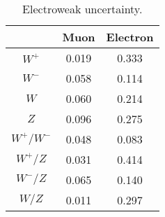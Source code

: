 \begin{table}%
\begin{center}
\end{center}


\caption{Uncertainties on muon channel acceptance, 13 TeV.}
\label{tab:Acc:unc:mu:13TeV}
\end{table}

\begin{table}%
\begin{center}
\begin{tabular}{|c|c|c||}
\hline
 & Muon & Electron  \\
\hline \hline
$W^+$     & 0.019   & 0.333     \\
$W^-$     & 0.058   & 0.114    \\
$W$       & 0.060   & 0.214    \\
$Z$       & 0.096   & 0.275     \\
$W^+/W^-$ & 0.048   & 0.083     \\
$W^+/Z$   & 0.031   & 0.414   \\
$W^-/Z$   & 0.065   & 0.140   \\
$W/Z$     & 0.011   & 0.297   \\
\hline
\end{tabular} 
\end{center}


\caption{Electroweak uncertainty.}
\label{tab:Acc:unc:mu:13TeV}
\end{table}






